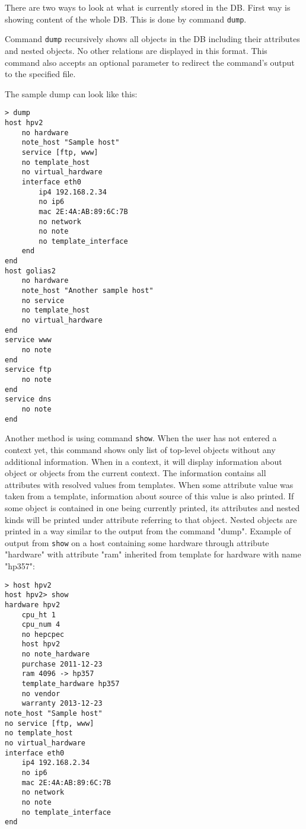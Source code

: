 \documentclass[deska]{subfiles}
\begin{document}
There are two ways to look at what is currently stored in the DB. First way is showing content of the whole DB. This
is done by command {\tt dump}.

Command {\tt dump} recursively shows all objects in the DB including their attributes and nested objects. No other
relations are displayed in this format. This command also accepts an optional parameter to redirect the command's output
to the specified file.

The sample dump can look like this:
\begin{verbatim}
> dump
host hpv2
    no hardware
    note_host "Sample host"
    service [ftp, www]
    no template_host
    no virtual_hardware
    interface eth0
        ip4 192.168.2.34
        no ip6
        mac 2E:4A:AB:89:6C:7B
        no network
        no note
        no template_interface
    end
end
host golias2
    no hardware
    note_host "Another sample host"
    no service
    no template_host
    no virtual_hardware
end
service www
    no note
end
service ftp
    no note
end
service dns
    no note
end
\end{verbatim}

Another method is using command {\tt show}. When the user has not entered a context yet, this command shows only list of top-level objects without any
additional information. When in a context, it will display information about object or objects from the current context. The
information contains all attributes with resolved values from templates. When some attribute value was taken from
a template, information about source of this value is also printed. If some object is contained in one being currently
printed, its attributes and nested kinds will be printed under attribute referring to that object. Nested objects are
printed in a way similar to the output from the command "dump". Example of output from {\tt show} on a host containing some hardware
through attribute "hardware" with attribute "ram" inherited from template for hardware with name "hp357":

\begin{verbatim}
> host hpv2
host hpv2> show
hardware hpv2
    cpu_ht 1
    cpu_num 4
    no hepcpec
    host hpv2
    no note_hardware
    purchase 2011-12-23
    ram 4096 -> hp357
    template_hardware hp357
    no vendor
    warranty 2013-12-23
note_host "Sample host"
no service [ftp, www]
no template_host
no virtual_hardware
interface eth0
    ip4 192.168.2.34
    no ip6
    mac 2E:4A:AB:89:6C:7B
    no network
    no note
    no template_interface
end
\end{verbatim}
\end{document}

